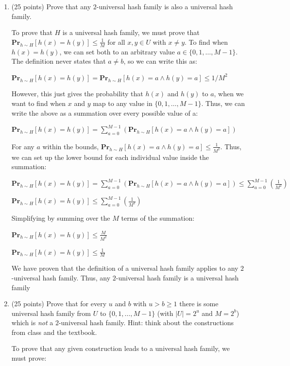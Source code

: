\documentclass[11pt]{article}
\begin{document}
\begin{enumerate}
\item (25 points)  Prove that any $2$-universal hash family is also a universal hash family. 

To prove that $H$ is a universal hash family, we must prove that $\textbf{Pr}_{h \sim H}[h(x) = h(y)] \leq \frac{1}{M}$ for all $x,y \in U$ with $x \neq y$. 
To find when $h(x) = h(y)$, we can set both to an arbitrary value $a \in \{0,1,\dots,M-1\}$. The definition never states that $a \neq b$, 
so we can write this as:  

$\textbf{Pr}_{h \sim H}[h(x) = h(y)] = \textbf{Pr}_{h \sim H}[h(x) = a \land h(y) = a] \leq 1/M^2$

However, this just gives the probability that $h(x)$ and $h(y)$ 
to $a$, when we want to find when $x$ and $y$ map to any value in $\{0,1,\dots,M-1\}$. Thus, we can write the above as a summation 
over every possible value of a: 

$\textbf{Pr}_{h \sim H}[h(x) = h(y)] = \sum_{a=0}^{M-1} (\textbf{Pr}_{h \sim H}[h(x) = a \land h(y) = a])$

For any $a$ within the bounds, $\textbf{Pr}_{h \sim H}[h(x) = a \land h(y) = a] \leq \frac{1}{M^2}$. 
Thus, we can set up the lower bound for each individual value inside the summation:

$\textbf{Pr}_{h \sim H}[h(x) = h(y)] = \sum_{a=0}^{M-1} (\textbf{Pr}_{h \sim H}[h(x) = a \land h(y) = a]) \leq \sum_{a=0}^{M-1} (\frac{1}{M^2})$

$\textbf{Pr}_{h \sim H}[h(x) = h(y)] \leq \sum_{a=0}^{M-1} (\frac{1}{M^2})$

Simplifying by summing over the $M$ terms of the summation:

$\textbf{Pr}_{h \sim H}[h(x) = h(y)] \leq \frac{M}{M^2}$

$\textbf{Pr}_{h \sim H}[h(x) = h(y)] \leq \frac{1}{M}$

We have proven that the definition of a universal hash family applies to any $2$-universal hash family. 
Thus, any $2$-universal hash family is a universal hash family

\item (25 points) Prove that for every $u$ and $b$ with $u > b \geq 1$ there is some universal hash family from $U$ to $\{0,1,\dots, M-1\}$ 
(with $|U| = 2^u$ and $M = 2^b$) which is \emph{not} a $2$-universal hash family. Hint: think about the constructions from class and the textbook.

To prove that any given construction leads to a universal hash family, we must prove:


\end{enumerate}
\end{document}
